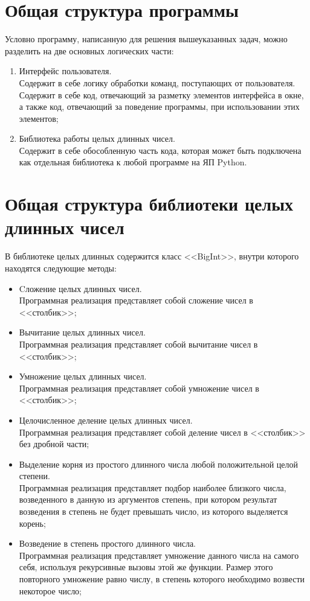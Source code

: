 \clearpage
\section{Общая структура программы}
Условно программу, написанную для решения вышеуказанных задач, можно разделить на две основных логических части:
\begin{enumerate}
    \item Интерфейс пользователя.\\
    Содержит в себе логику обработки команд, поступающих от пользователя. Содержит в себе код,
    отвечающий за разметку элементов интерфейса в окне, а также код, отвечающий за поведение программы, при использовании этих элементов;
    \item Библиотека работы целых длинных чисел.\\
    Содержит в себе обособленную часть кода, которая может быть подключена как отдельная библиотека к любой программе на ЯП Python.
\end{enumerate}


\clearpage
\section{Общая структура библиотеки целых\\длинных чисел}
В библиотеке целых длинных содержится класс <<BigInt>>, внутри которого находятся следующие методы:
\begin{itemize}
    \item Cложение целых длинных чисел.\\
    Программная реализация представляет собой сложение чисел в <<столбик>>;
    \item Вычитание целых длинных чисел.\\
    Программная реализация представляет собой вычитание чисел в <<столбик>>;
    \item Умножение целых длинных чисел.\\
    Программная реализация представляет собой умножение чисел в <<столбик>>;
    \item Целочисленное деление целых длинных чисел.\\
    Программная реализация представляет собой деление чисел в <<столбик>> без дробной части;
    \item Выделение корня из простого длинного числа любой положительной целой степени.\\
    Программная реализация представляет подбор наиболее близкого числа, возведенного в данную из аргументов степень,
    при котором результат возведения в степень не будет превышать число, из которого выделяется корень;
    \item Возведение в степень простого длинного числа.\\
    Программная реализация представляет умножение данного числа на самого себя, используя рекурсивные вызовы этой же функции.
    Размер этого повторного умножение равно числу, в степень которого необходимо возвести некоторое число;
\end{itemize}

